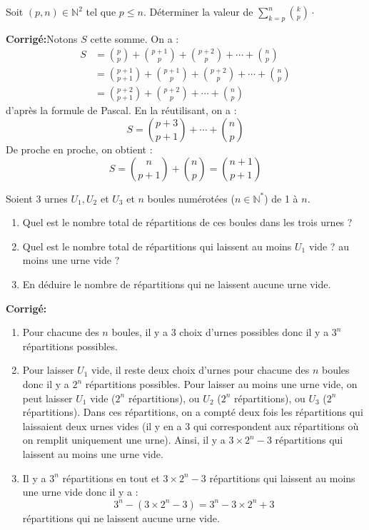 \documentclass[a4paper,twoside,french,10pt]{VcCours}
\newcommand{\corr}{\textbf{Corrigé:}}
\begin{document}
\begin{Exercice}{} 
	Soit $(p, n) \in \mathbb{N}^2$ tel que $p \leq n$. 
	Déterminer la valeur de $\sum_{k=p}^n{\binom{k}{p}} \cdot$

\end{Exercice}

\corr Notons $S$ cette somme. On a :
\begin{align*}
S & = \binom{p}{p} + \binom{p+1}{p} + \binom{p+2}{p} + \cdots + \binom{n}{p} \\
& = \binom{p+1}{p+1} + \binom{p+1}{p} + \binom{p+2}{p} + \cdots + \binom{n}{p} \\
& =  \binom{p+2}{p+1} + \binom{p+2}{p} + \cdots + \binom{n}{p} 
\end{align*}
d'après la formule de Pascal. En la réutilisant, on a :
$$ S = \binom{p+3}{p+1} +  \cdots + \binom{n}{p} $$
De proche en proche, on obtient :
$$ S = \binom{n}{p+1}  + \binom{n}{p} = \binom{n+1}{p+1} $$

\begin{Exercice}{}Soient $3$ urnes $U_1,U_2$ et $U_3$ et $n$ boules numérotées ($n \in \mathbb{N}^*$) de 1 à $n$.
\begin{enumerate}
\item Quel est le nombre total de répartitions de ces boules dans les trois urnes ?
\item Quel est le nombre total de répartitions qui laissent au moins $U_1$ vide ? au moins une urne vide ?
\item En déduire le nombre de répartitions qui ne laissent aucune urne vide.
\end{enumerate}
\end{Exercice}

\corr 

\begin{enumerate}
\item Pour chacune des $n$ boules, il y a $3$ choix d'urnes possibles donc il y a $3^n$ répartitions possibles.
\item Pour laisser $U_1$ vide, il reste deux choix d'urnes pour chacune des $n$ boules donc il y a $2^n$ répartitions possibles. Pour laisser au moins une urne vide, on peut laisser $U_1$ vide ($2^n$ répartitions), ou $U_2$  ($2^n$ répartitions), ou $U_3$  ($2^n$ répartitions). Dans ces répartitions, on a compté deux fois les répartitions qui laissaient deux urnes vides (il y en a $3$ qui correspondent aux répartitions où on remplit uniquement une urne). Ainsi, il y a $3 \times 2^n - 3$ répartitions qui laissent au moins une urne vide.
\item Il y a $3^n$ répartitions en tout et $3 \times 2^n - 3$ répartitions qui laissent au moins une urne vide donc il y a :
$$ 3^n - (3 \times 2^n - 3) = 3^n - 3 \times 2^n + 3$$
répartitions qui ne laissent aucune urne vide.
\end{enumerate}
\end{document}
